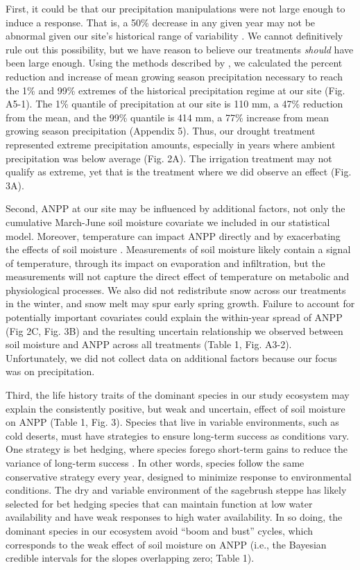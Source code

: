 \documentclass[fleqn,10pt,lineno]{wlpeerj} %
\begin{document}
First, it could be that our precipitation manipulations were not large
enough to induce a response. That is, a 50\% decrease in any given year
may not be abnormal given our site's historical range of variability
\citep{Knapp2017}. We cannot definitively rule out this possibility, but
we have reason to believe our treatments \emph{should} have been large
enough. Using the methods described by \citet{Lemoine2016}, we
calculated the percent reduction and increase of mean growing season
precipitation necessary to reach the 1\% and 99\% extremes of the
historical precipitation regime at our site (Fig. A5-1). The 1\%
quantile of precipitation at our site is 110 mm, a 47\% reduction from
the mean, and the 99\% quantile is 414 mm, a 77\% increase from mean
growing season precipitation (Appendix 5). Thus, our drought treatment
represented extreme precipitation amounts, especially in years where
ambient precipitation was below average (Fig. 2A). The irrigation
treatment may not qualify as extreme, yet that is the treatment where we
did observe an effect (Fig. 3A).

Second, ANPP at our site may be influenced by additional factors, not
only the cumulative March-June soil moisture covariate we included in
our statistical model.  \citet{LaPierre2016}
Moreover, temperature can impact ANPP directly \citep{Epstein1997} and
by exacerbating the effects of soil moisture \citep{DeBoeck2011}.
Measurements of soil moisture likely contain a signal of temperature,
through its impact on evaporation and infiltration, but the measurements
will not capture the direct effect of temperature on metabolic and
physiological processes. We also did not redistribute snow across our
treatments in the winter, and snow melt may spur early spring growth.
Failure to account for potentially important covariates could explain
the within-year spread of ANPP (Fig 2C, Fig. 3B) and the resulting
uncertain relationship we observed between soil moisture and ANPP across
all treatments (Table 1, Fig. A3-2). Unfortunately, we did not collect
data on additional factors because our focus was on precipitation.

Third, the life history traits of the dominant species in our study
ecosystem may explain the consistently positive, but weak and uncertain,
effect of soil moisture on ANPP (Table 1, Fig. 3). Species that live in
variable environments, such as cold deserts, must have strategies to
ensure long-term success as conditions vary. One strategy is bet
hedging, where species forego short-term gains to reduce the variance of
long-term success \citep{Seger1987}. In other words, species follow the
same conservative strategy every year, designed to minimize response to
environmental conditions. The dry and variable environment of the
sagebrush steppe has likely selected for bet hedging species that can
maintain function at low water availability and have weak responses to
high water availability. In so doing, the dominant species in our
ecosystem avoid ``boom and bust'' cycles, which corresponds to the weak
effect of soil moisture on ANPP (i.e., the Bayesian credible intervals
for the slopes overlapping zero; Table 1).
\end{document}
